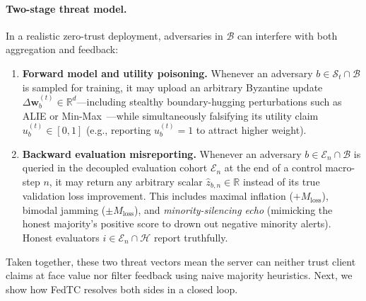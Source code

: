 \paragraph{Two-stage threat model.}
In a realistic zero-trust deployment, adversaries in $\mathcal{B}$ can interfere with both aggregation and feedback:
\begin{enumerate}
    \item \textbf{Forward model and utility poisoning.} Whenever an adversary $b \in \mathcal{S}_t \cap \mathcal{B}$ is sampled for training, it may upload an arbitrary Byzantine update $\Delta\mathbf{w}_b^{(t)} \in \mathbb{R}^d$---including stealthy boundary-hugging perturbations such as ALIE or Min-Max~\cite{shejwalkar2021manipulating}---while simultaneously falsifying its utility claim $u_b^{(t)} \in [0, 1]$ (e.g., reporting $u_b^{(t)} = 1$ to attract higher weight).
    \item \textbf{Backward evaluation misreporting.} Whenever an adversary $b \in \mathcal{E}_n \cap \mathcal{B}$ is queried in the decoupled evaluation cohort $\mathcal{E}_n$ at the end of a control macro-step $n$, it may return any arbitrary scalar $\hat{z}_{b,n} \in \mathbb{R}$ instead of its true validation loss improvement. This includes maximal inflation ($+M_{\mathrm{loss}}$), bimodal jamming ($\pm M_{\mathrm{loss}}$), and \emph{minority-silencing echo} (mimicking the honest majority's positive score to drown out negative minority alerts). Honest evaluators $i \in \mathcal{E}_n \cap \mathcal{H}$ report truthfully.
\end{enumerate}

Taken together, these two threat vectors mean the server can neither trust client claims at face value nor filter feedback using naive majority heuristics. Next, we show how FedTC resolves both sides in a closed loop.
